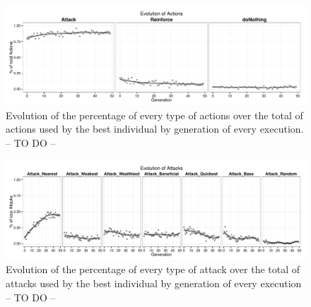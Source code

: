 \documentclass[preprint]{elsarticle}
\begin{document}
 \begin{figure}[ht]
 \begin{center}
   \includegraphics[width=12cm]{nuevas_imgs/estudio_ACTIONS.pdf}
 \end{center}
 \caption{Evolution of the percentage of every type of actions over the total of actions used by the best individual by generation of every execution. -- TO DO -- %
 }
 \label{figura:e_actions}
 \end{figure}

 \begin{figure}[ht]
 \begin{center}
   \includegraphics[width=12cm]{nuevas_imgs/estudio_ATTACKS.pdf}
 \end{center}
 \caption{Evolution of the percentage of every type of attack over the total of attacks used by the best individual by generation of every execution -- TO DO -- %
 }
 \label{figura:e_attacks}
 \end{figure}
\end{document}
